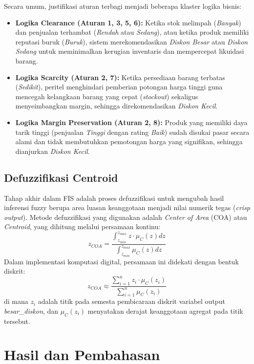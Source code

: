 \documentclass[conference]{IEEEtran}
\begin{document}
Secara umum, justifikasi aturan terbagi menjadi beberapa klaster logika bisnis:
\begin{itemize}
    \item \textbf{Logika Clearance (Aturan 1, 3, 5, 6):} Ketika stok melimpah (\textit{Banyak}) dan penjualan terhambat (\textit{Rendah} atau \textit{Sedang}), atau ketika produk memiliki reputasi buruk (\textit{Buruk}), sistem merekomendasikan \textit{Diskon Besar} atau \textit{Diskon Sedang} untuk meminimalkan kerugian inventaris dan mempercepat likuidasi barang.
    \item \textbf{Logika Scarcity (Aturan 2, 7):} Ketika persediaan barang terbatas (\textit{Sedikit}), peritel menghindari pemberian potongan harga tinggi guna mencegah kelangkaan barang yang cepat (\textit{stockout}) sekaligus menyeimbangkan margin, sehingga direkomendasikan \textit{Diskon Kecil}.
    \item \textbf{Logika Margin Preservation (Aturan 2, 8):} Produk yang memiliki daya tarik tinggi (penjualan \textit{Tinggi} dengan rating \textit{Baik}) sudah disukai pasar secara alami dan tidak membutuhkan pemotongan harga yang signifikan, sehingga dianjurkan \textit{Diskon Kecil}.
\end{itemize}

\subsection{Defuzzifikasi Centroid}
Tahap akhir dalam FIS adalah proses defuzzifikasi untuk mengubah hasil inferensi fuzzy berupa area luasan keanggotaan menjadi nilai numerik tegas (\textit{crisp output}). Metode defuzzifikasi yang digunakan adalah \textit{Center of Area} (COA) atau \textit{Centroid}, yang dihitung melalui persamaan kontinu:
\begin{equation}
    z_{COA} = \frac{\int_{z_{min}}^{z_{max}} z \cdot \mu_C(z) dz}{\int_{z_{min}}^{z_{max}} \mu_C(z) dz}
\end{equation}
Dalam implementasi komputasi digital, persamaan ini didekati dengan bentuk diskrit:
\begin{equation}
    z_{COA} \approx \frac{\sum_{i=1}^n z_i \cdot \mu_C(z_i)}{\sum_{i=1}^n \mu_C(z_i)}
\end{equation}
di mana $z_i$ adalah titik pada semesta pembicaraan diskrit variabel output \textit{besar\_diskon}, dan $\mu_C(z_i)$ menyatakan derajat keanggotaan agregat pada titik tersebut.

\section{Hasil dan Pembahasan}
\end{document}
